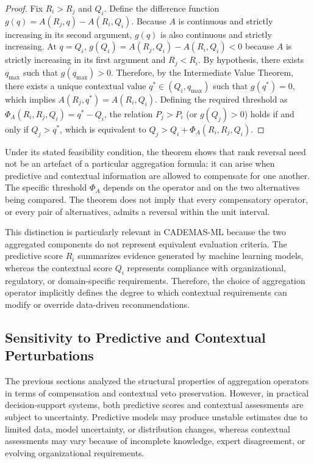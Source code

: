 \documentclass[mathematics,article,submit,moreauthors]{Definitions/mdpi}
\begin{document}
\begin{proof}
    Fix $R_i>R_j$ and $Q_i$. Define the difference function
    $g(q)=A(R_j,q)-A(R_i,Q_i)$.
    Because $A$ is continuous and strictly increasing in its second argument, $g(q)$ is also continuous and strictly increasing.
    At $q=Q_i$, $g(Q_i)=A(R_j,Q_i)-A(R_i,Q_i)<0$ because $A$ is strictly increasing in its first argument and $R_j<R_i$.
    By hypothesis, there exists $q_{\max}$ such that $g(q_{\max}) > 0$. Therefore, by the Intermediate Value Theorem, there exists a unique contextual value $q^\ast \in (Q_i, q_{\max})$ such that $g(q^\ast)=0$, which implies $A(R_j,q^\ast)=A(R_i,Q_i)$.
    Defining the required threshold as $\Phi_A(R_i,R_j,Q_i)=q^\ast-Q_i$, {\color{teal}the relation} $P_j>P_i$ (or $g(Q_j)>0$) {\color{teal}holds} if and only if $Q_j>q^\ast$, which is equivalent to $Q_j>Q_i+\Phi_A(R_i,R_j,Q_i)$.
\end{proof}

{\color{blue}Under its stated feasibility condition, the theorem shows that
rank reversal need not be an artefact of a particular aggregation formula:
it can arise when predictive and contextual information are allowed to
compensate for one another. The specific threshold $\Phi_A$ depends on the
operator and on the two alternatives being compared. The theorem does not
imply that every compensatory operator, or every pair of alternatives,
admits a reversal within the unit interval.}

This distinction is particularly relevant in CADEMAS-ML because the two
aggregated components do not represent equivalent evaluation criteria.
The predictive score $R_i$ summarizes evidence generated by machine
learning models, whereas the contextual score $Q_i$ represents compliance
with organizational, regulatory, or domain-specific requirements.
Therefore, the choice of aggregation operator implicitly defines the
degree to which contextual requirements can modify or override
data-driven recommendations.

\subsection{Sensitivity to Predictive and Contextual Perturbations}
\label{subsec:sensitivity-analysis}

The previous sections analyzed the structural properties of aggregation
operators in terms of compensation and contextual veto preservation.
However, in practical decision-support systems, both predictive scores
and contextual assessments are subject to uncertainty. Predictive
models may produce unstable estimates due to limited data, model
uncertainty, or distribution changes, whereas contextual assessments may
vary because of incomplete knowledge, expert disagreement, or evolving
organizational requirements.
\end{document}
